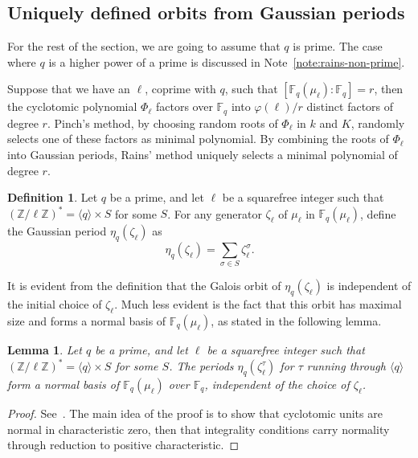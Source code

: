\documentclass[12pt]{article}
\theoremstyle{plain}
\newtheorem{lemma}[theorem]{Lemma}
\theoremstyle{definition}
\newtheorem{definition}[theorem]{Definition}
\def\Z{\ensuremath{\mathbb{Z}}}
\def\F{\ensuremath{\mathbb{F}}}
\def\euler{\ensuremath{\varphi}}
\begin{document}
\subsection{Uniquely defined orbits from Gaussian periods}

For the rest of the section, we are going to assume that $q$ is
prime. The case where $q$ is a higher power of a prime is discussed in
Note~\ref{note:rains-non-prime}.

Suppose that we have an $\ell$, coprime with $q$, such that
$[\F_q(\mu_\ell):\F_q]=r$, then the cyclotomic polynomial $\Phi_\ell$
factors over $\F_q$ into $\euler(\ell)/r$ distinct factors of degree
$r$. Pinch's method, by choosing random roots of $\Phi_\ell$ in $k$
and $K$, randomly selects one of these factors as minimal polynomial.
By combining the roots of $\Phi_\ell$ into Gaussian periods, Rains'
method uniquely selects a minimal polynomial of degree $r$.

\begin{definition}
  Let $q$ be a prime, and let $\ell$ be a squarefree integer such that
  $(\Z/\ell\Z)^\ast = \langle q\rangle \times S$ for some $S$.  For any
  generator $\zeta_\ell$ of $\mu_\ell$ in $\F_q(\mu_\ell)$, define the
  Gaussian period $\eta_q(\zeta_\ell)$ as
  \begin{equation}
    \eta_q(\zeta_\ell) = \sum_{\sigma\in S}{\zeta_\ell^{\sigma}}.
  \end{equation}
\end{definition}

It is evident from the definition that the Galois orbit of
$\eta_q(\zeta_\ell)$ is independent of the initial choice of
$\zeta_\ell$. Much less evident is the fact that this orbit has
maximal size and forms a normal basis of $\F_q(\mu_\ell)$, as stated
in the following lemma.

\begin{lemma}
  \label{th:gaussian}
  Let $q$ be a prime, and let $\ell$ be a squarefree integer such that
  $(\Z/\ell\Z)^\ast = \langle q\rangle \times S$ for some $S$.  The
  periods $\eta_q(\zeta_\ell^\tau)$ for $\tau$ running through
  $\langle q\rangle$ form a normal basis of $\F_q(\mu_\ell)$ over
  $\F_q$, independent of the choice of $\zeta_\ell$.
\end{lemma}
\begin{proof}
  See~\cite[Main Theorem]{feisel1999normal}.
  The main idea of the proof is to show that cyclotomic units are
  normal in characteristic zero, then that integrality conditions
  carry normality through reduction to positive characteristic.
\end{proof}
\end{document}
